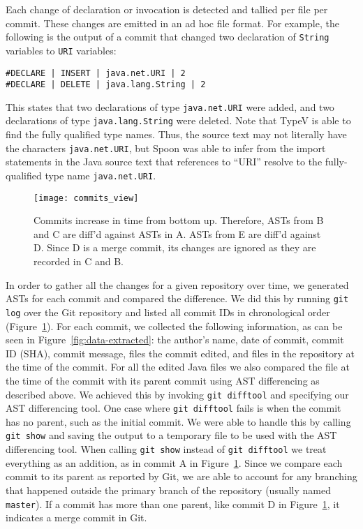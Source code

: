Each change of declaration or invocation is detected and tallied per file per commit. These changes are emitted in an ad hoc file format. For example, the following is the output of a commit that changed two declaration of \texttt{String} variables to \texttt{URI} variables:

\begin{verbatim}
#DECLARE | INSERT | java.net.URI | 2
#DECLARE | DELETE | java.lang.String | 2
\end{verbatim}

This states that two declarations of type \texttt{java.net.URI} were added, and two declarations of type \texttt{java.lang.String} were deleted. Note that TypeV is able to find the fully qualified type names. Thus, the source text may not literally have the characters \texttt{java.net.URI}, but Spoon was able to infer from the import statements in the Java source text that references to ``URI'' resolve to the fully-qualified type name \texttt{java.net.URI}. 

\begin{figure}[b]
\centering
\texttt{[image: commits\_view]}
\caption{Commits increase in time from bottom up. Therefore, ASTs from B and C are diff'd against ASTs in A. ASTs from E are diff'd against D. Since D is a merge commit, its changes are ignored as they are recorded in C and B.}
\label{fig:commits}
\end{figure}

In order to gather all the changes for a given repository over time, we generated ASTs for each commit and compared the difference. We did this by running \texttt{git log} over the Git repository and listed all commit IDs in chronological order (Figure~\ref{fig:commits}). For each commit, we collected the following information, as can be seen in Figure~\ref{fig:data-extracted}: the author's name, date of commit, commit ID (SHA), commit message, files the commit edited, and files in the repository at the time of the commit. For all the edited Java files we also compared the file at the time of the commit with its parent commit using AST differencing as described above. We achieved this by invoking \texttt{git difftool} and specifying our AST differencing tool. One case where \texttt{git difftool} fails is when the commit has no parent, such as the initial commit. We were able to handle this by calling \texttt{git show} and saving the output to a temporary file to be used with the AST differencing tool. When calling \texttt{git show} instead of \texttt{git difftool} we treat everything as an addition, as in commit A in Figure~\ref{fig:commits}. Since we compare each commit to its parent as reported by Git, we are able to account for any branching that happened outside the primary branch of the repository (usually named \texttt{master}). If a commit has more than one parent, like commit D in Figure~\ref{fig:commits}, it indicates a merge commit in Git.

